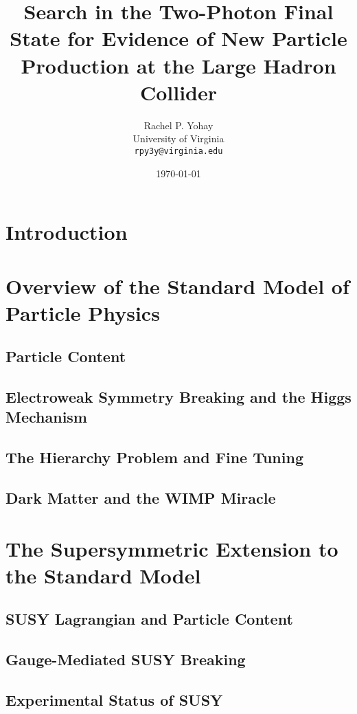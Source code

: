 \documentclass[12pt, letterpaper]{report}
\begin{document}
\title{Search in the Two-Photon Final State for Evidence of New Particle Production at the Large Hadron Collider}
\author{Rachel P. Yohay \\
	University of Virginia \\
	\texttt{rpy3y@virginia.edu}}
\date{\today}
\maketitle

\tableofcontents

\chapter{Introduction}

\chapter{Overview of the Standard Model of Particle Physics}
\section{Particle Content}
\section{Electroweak Symmetry Breaking and the Higgs Mechanism}
\section{The Hierarchy Problem and Fine Tuning}
\section{Dark Matter and the WIMP Miracle}

\chapter{The Supersymmetric Extension to the Standard Model}
\section{SUSY Lagrangian and Particle Content}
\section{Gauge-Mediated SUSY Breaking}
\section{Experimental Status of SUSY}
\end{document}
